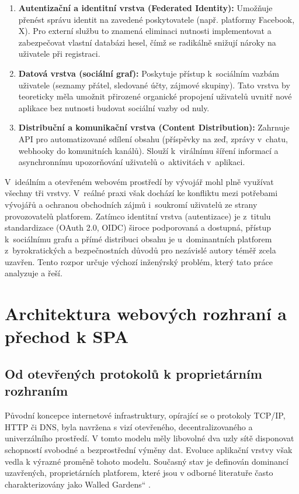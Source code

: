 \documentclass[male,czech,api_bc]{kitheses}
\newcommand{\UV}[1]{\quotedblbase#1\textquotedblleft}
\begin{document}
\begin{enumerate}
    \item \textbf{Autentizační a identitní vrstva (Federated Identity):} Umožňuje přenést správu identit na zavedené poskytovatele (např. platformy Facebook, X). Pro externí službu to znamená eliminaci nutnosti implementovat a zabezpečovat vlastní databázi hesel, čímž se radikálně snižují nároky na uživatele při registraci.
    
    \item \textbf{Datová vrstva (sociální graf):} Poskytuje přístup k~sociálním vazbám uživatele (seznamy přátel, sledované účty, zájmové skupiny). Tato vrstva by teoreticky měla umožnit přirozené organické propojení uživatelů uvnitř nové aplikace bez nutnosti budovat sociální vazby od nuly.
    
    \item \textbf{Distribuční a komunikační vrstva (Content Distribution):} Zahrnuje API pro automatizované sdílení obsahu (příspěvky na zeď, zprávy v~chatu, webhooky do komunitních kanálů). Slouží k~virálnímu šíření informací a asynchronnímu upozorňování uživatelů o~aktivitách v~aplikaci.
\end{enumerate}

V~ideálním a otevřeném webovém prostředí by vývojář mohl plně využívat všechny tři vrstvy. V~reálné praxi však dochází ke konfliktu mezi potřebami vývojářů a ochranou obchodních zájmů i~soukromí uživatelů ze strany provozovatelů platforem. Zatímco identitní vrstva (autentizace) je z~titulu standardizace (OAuth 2.0, OIDC) široce podporovaná a dostupná, přístup k~sociálnímu grafu a přímé distribuci obsahu je u~dominantních platforem z~byrokratických a bezpečnostních důvodů pro nezávislé autory téměř zcela uzavřen. Tento rozpor určuje výchozí inženýrský problém, který tato práce analyzuje a řeší.

\clearpage

\section{Architektura webových rozhraní a přechod k SPA}

\subsection{Od otevřených protokolů k proprietárním rozhraním}
\label{subsec:od_otevrenych_protokolu_k_proprietarnim_rozhranim}

Původní koncepce internetové infrastruktury, opírající se o protokoly TCP/IP, HTTP či DNS, byla navržena s vizí otevřeného, decentralizovaného a univerzálního prostředí. V tomto modelu měly libovolné dva uzly sítě disponovat schopností svobodné a bezprostřední výměny dat. Evoluce aplikační vrstvy však vedla k výrazné proměně tohoto modelu. Současný stav je definován dominancí uzavřených, proprietárních platforem, které jsou v odborné literatuře často charakterizovány jako \UV{Walled Gardens} \cite{Marro2025}.
\end{document}
